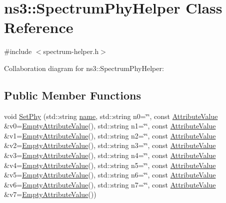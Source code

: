 \hypertarget{classns3_1_1SpectrumPhyHelper}{}\section{ns3\+:\+:Spectrum\+Phy\+Helper Class Reference}
\label{classns3_1_1SpectrumPhyHelper}


{\ttfamily \#include $<$spectrum-\/helper.\+h$>$}



Collaboration diagram for ns3\+:\+:Spectrum\+Phy\+Helper\+:
\subsection*{Public Member Functions}
\begin{DoxyCompactItemize}
\item 
void \hyperlink{classns3_1_1SpectrumPhyHelper_a2f0713b637c5d11cf46e34500b09d863}{Set\+Phy} (std\+::string \hyperlink{generate__test__data__lte__spectrum__model_8m_ab74e6bf80237ddc4109968cedc58c151}{name}, std\+::string n0=\char`\"{}\char`\"{}, const \hyperlink{classns3_1_1AttributeValue}{Attribute\+Value} \&v0=\hyperlink{classns3_1_1EmptyAttributeValue}{Empty\+Attribute\+Value}(), std\+::string n1=\char`\"{}\char`\"{}, const \hyperlink{classns3_1_1AttributeValue}{Attribute\+Value} \&v1=\hyperlink{classns3_1_1EmptyAttributeValue}{Empty\+Attribute\+Value}(), std\+::string n2=\char`\"{}\char`\"{}, const \hyperlink{classns3_1_1AttributeValue}{Attribute\+Value} \&v2=\hyperlink{classns3_1_1EmptyAttributeValue}{Empty\+Attribute\+Value}(), std\+::string n3=\char`\"{}\char`\"{}, const \hyperlink{classns3_1_1AttributeValue}{Attribute\+Value} \&v3=\hyperlink{classns3_1_1EmptyAttributeValue}{Empty\+Attribute\+Value}(), std\+::string n4=\char`\"{}\char`\"{}, const \hyperlink{classns3_1_1AttributeValue}{Attribute\+Value} \&v4=\hyperlink{classns3_1_1EmptyAttributeValue}{Empty\+Attribute\+Value}(), std\+::string n5=\char`\"{}\char`\"{}, const \hyperlink{classns3_1_1AttributeValue}{Attribute\+Value} \&v5=\hyperlink{classns3_1_1EmptyAttributeValue}{Empty\+Attribute\+Value}(), std\+::string n6=\char`\"{}\char`\"{}, const \hyperlink{classns3_1_1AttributeValue}{Attribute\+Value} \&v6=\hyperlink{classns3_1_1EmptyAttributeValue}{Empty\+Attribute\+Value}(), std\+::string n7=\char`\"{}\char`\"{}, const \hyperlink{classns3_1_1AttributeValue}{Attribute\+Value} \&v7=\hyperlink{classns3_1_1EmptyAttributeValue}{Empty\+Attribute\+Value}())
\item 

\end{DoxyCompactItemize}
